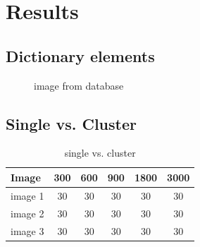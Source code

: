 \chapter{Results}


\section{Dictionary elements}
\begin{figure}[h]
\centering
{}
\hspace{5mm}
\hspace{5mm}
\hspace{5mm}
\hspace{5mm}
\caption{image from database}
\label{fig:USC-SIPI}
\end{figure}

\section{Single vs. Cluster}
\begin{table}[h]
\caption{single vs. cluster}
\centering
\begin{tabular}{l c c c c c}
\hline\hline
Image & 300 & 600 & 900 & 1800 & 3000 \\
\hline
image 1 & 30 & 30 & 30 & 30 & 30 \\
image 2 & 30 & 30 & 30 & 30 & 30 \\
image 3 & 30 & 30 & 30 & 30 & 30 \\
\hline
\end{tabular}
\end{table}

